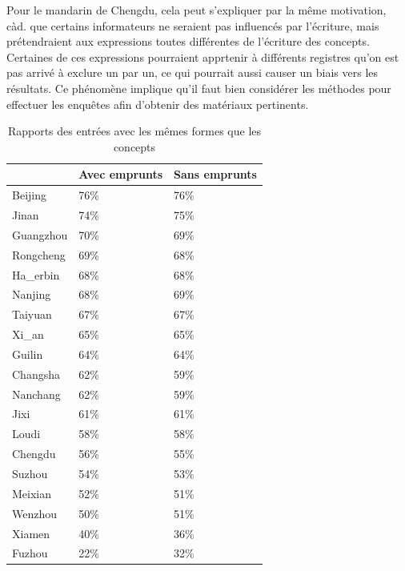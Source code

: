 \documentclass{scrbook}
\newcounter{c}[subsubsection]
\begin{document}
\begin{sloppypar}
Pour le mandarin de Chengdu, cela peut s'expliquer par la même motivation, càd. que certains informateurs ne seraient pas influencés par l'écriture, mais prétendraient aux expressions toutes différentes de l'écriture des concepts. Certaines de ces expressions pourraient apprtenir à différents registres qu'on est pas arrivé à exclure un par un, ce qui pourrait aussi causer un biais vers les résultats. Ce phénomène implique qu'il faut bien considérer les méthodes pour effectuer les enquêtes afin d'obtenir des matériaux pertinents.

\begin{table}[htbp]
  \centering

    \begin{tabular}{lll}
    \toprule
          & \multicolumn{1}{l}{Avec emprunts} & \multicolumn{1}{l}{Sans emprunts} \\
    \midrule
    Beijing    & 76\%  & 76\% \\
    Jinan      & 74\%  & 75\% \\
    Guangzhou  & \cellcolor[rgb]{ .851,  .851,  .851}70\% & \cellcolor[rgb]{ .851,  .851,  .851}69\% \\
    Rongcheng  & 69\%  & 68\% \\
    Ha\_erbin   & 68\%  & 68\% \\
    Nanjing    & 68\%  & 69\% \\
    Taiyuan    & 67\%  & 67\% \\
    Xi\_an      & 65\%  & 65\% \\
    Guilin     & 64\%  & 64\% \\
    \midrule
    Changsha   & 62\%  & 59\% \\
    Nanchang   & 62\%  & 59\% \\
    Jixi       & 61\%  & 61\% \\
    Loudi      & 58\%  & 58\% \\
    Chengdu    & \cellcolor[rgb]{ .851,  .851,  .851}56\% & \cellcolor[rgb]{ .851,  .851,  .851}55\% \\
    Suzhou     & 54\%  & 53\% \\
    \midrule
    Meixian    & 52\%  & 51\% \\
    Wenzhou    & 50\%  & 51\% \\
    Xiamen     & 40\%  & 36\% \\
    Fuzhou     & 22\%  & 32\% \\
    \bottomrule
    \end{tabular}%
  \caption{Rapports des entrées avec les mêmes formes que les concepts}
  \label{tab:rapport_litteral}%
\end{table}%


\end{sloppypar}
\end{document}
